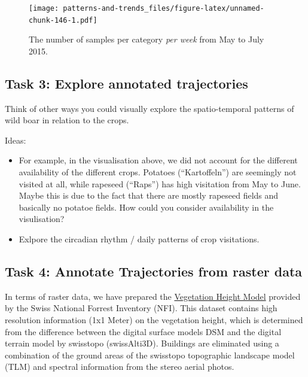 \documentclass[]{book}
\providecommand{\tightlist}{%
  \setlength{\itemsep}{0pt}\setlength{\parskip}{0pt}}
\begin{document}
\begin{figure}
\centering
\texttt{[image: patterns-and-trends\_files/figure-latex/unnamed-chunk-146-1.pdf]}
\caption{\label{fig:unnamed-chunk-146}The number of samples per category \emph{per week} from May to July 2015.}
\end{figure}

\hypertarget{task-3-explore-annotated-trajectories}{%
\subsection{Task 3: Explore annotated trajectories}\label{task-3-explore-annotated-trajectories}}

Think of other ways you could visually explore the spatio-temporal patterns of wild boar in relation to the crops.

Ideas:

\begin{itemize}
\tightlist
\item
  For example, in the visualisation above, we did not account for the different availability of the different crops. Potatoes (``Kartoffeln'') are seemingly not visited at all, while rapeseed (``Raps'') has high visitation from May to June. Maybe this is due to the fact that there are mostly rapeseed fields and basically no potatoe fields. How could you consider availability in the visulisation?
\item
  Exlpore the circadian rhythm / daily patterns of crop visitations.
\end{itemize}

\hypertarget{task-4-annotate-trajectories-from-raster-data}{%
\subsection{Task 4: Annotate Trajectories from raster data}\label{task-4-annotate-trajectories-from-raster-data}}

In terms of raster data, we have prepared the \href{https://map.geo.admin.ch/index.html?zoom=5\&lang=en\&topic=ech\&bgLayer=ch.swisstopo.pixelkarte-grau\&layers_opacity=0.5\&layers=ch.bafu.landesforstinventar-vegetationshoehenmodell\&E=2627157.14\&N=1122170.97}{Vegetation Height Model} provided by the Swiss National Forrest Inventory (NFI). This dataset contains high resolution information (1x1 Meter) on the vegetation height, which is determined from the difference between the digital surface models DSM and the digital terrain model by swisstopo (swissAlti3D). Buildings are eliminated using a combination of the ground areas of the swisstopo topographic landscape model (TLM) and spectral information from the stereo aerial photos.
\end{document}
